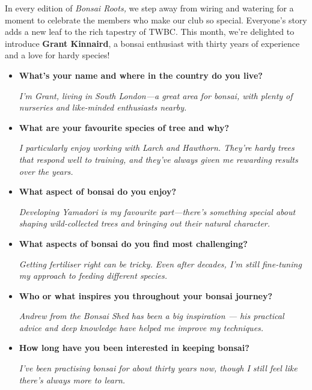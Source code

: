 \label{2025-07-roots}
\noindent
In every edition of \emph{Bonsai Roots,} we step away from wiring and watering for a moment to celebrate the members who make our club so special.
Everyone's story adds a new leaf to the rich tapestry of TWBC.
This month, we're delighted to introduce \textbf{Grant Kinnaird}, a bonsai enthusiast with thirty years of experience and a love for hardy species!

\begin{itemize}
    \item \textbf{What's your name and where in the country do you live?}

    \emph{I'm Grant, living in South London---a great area for bonsai, with plenty of nurseries and like\--minded enthusiasts nearby.}

    \item \textbf{What are your favourite species of tree and why?}

    \emph{I particularly enjoy working with Larch and Hawthorn. They're hardy trees that respond well to training, and they've always given me rewarding results over the years.}

    \item \textbf{What aspect of bonsai do you enjoy?}

    \emph{Developing Yamadori is my favourite part---there's something special about shaping wild\--collected trees and bringing out their natural character.}

    \item \textbf{What aspects of bonsai do you find most challenging?}

    \emph{Getting fertiliser right can be tricky. Even after decades, I'm still fine\--tuning my approach to feeding different species.}

    \item \textbf{Who or what inspires you throughout your bonsai journey?}

    \emph{Andrew from the Bonsai Shed has been a big inspiration --- his practical advice and deep knowledge have helped me improve my techniques.}

    \item \textbf{How long have you been interested in keeping bonsai?}

    \emph{I've been practising bonsai for about thirty years now, though I still feel like there's always more to learn.}


\end{itemize}
